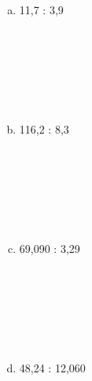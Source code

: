 \documentclass[a4paper,14pt]{article}
\begin{document}
\begin{multicols}{2}
\begin{enumerate}
\begin{enumerate}[a)]
   				\item 11,7 : 3,9 \\\\\\\\\\\\\\
   				\item 116,2 : 8,3 \\\\\\\\\\\\\\
   				\item 69,090 : 3,29 \\\\\\\\\\\\\\
   				\item 48,24 : 12,060 \\\\\\\\\\\\\\
   			\end{enumerate}
   		\end{enumerate}
        $~$ \\ $~$ \\ $~$ \\ $~$ \\ $~$ \\ $~$ \\ $~$ \\ 
        \end{multicols}
\end{document}
